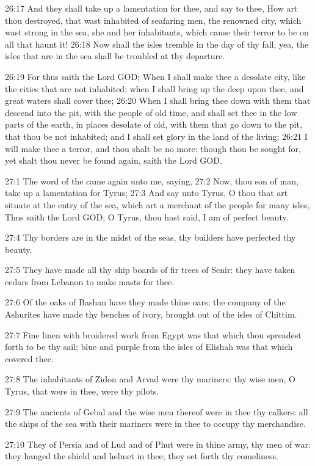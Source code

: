 26:17 And they shall take up a lamentation for thee, and say to thee, How art thou destroyed, that wast inhabited of seafaring men, the renowned city, which wast strong in the sea, she and her inhabitants, which cause their terror to be on all that haunt it!  26:18 Now shall the isles tremble in the day of thy fall; yea, the isles that are in the sea shall be troubled at thy departure.

26:19 For thus saith the Lord GOD; When I shall make thee a desolate city, like the cities that are not inhabited; when I shall bring up the deep upon thee, and great waters shall cover thee; 26:20 When I shall bring thee down with them that descend into the pit, with the people of old time, and shall set thee in the low parts of the earth, in places desolate of old, with them that go down to the pit, that thou be not inhabited; and I shall set glory in the land of the living; 26:21 I will make thee a terror, and thou shalt be no more: though thou be sought for, yet shalt thou never be found again, saith the Lord GOD.

27:1 The word of the \LORD came again unto me, saying, 27:2 Now, thou son of man, take up a lamentation for Tyrus; 27:3 And say unto Tyrus, O thou that art situate at the entry of the sea, which art a merchant of the people for many isles, Thus saith the Lord GOD; O Tyrus, thou hast said, I am of perfect beauty.

27:4 Thy borders are in the midst of the seas, thy builders have perfected thy beauty.

27:5 They have made all thy ship boards of fir trees of Senir: they have taken cedars from Lebanon to make masts for thee.

27:6 Of the oaks of Bashan have they made thine oars; the company of the Ashurites have made thy benches of ivory, brought out of the isles of Chittim.

27:7 Fine linen with broidered work from Egypt was that which thou spreadest forth to be thy sail; blue and purple from the isles of Elishah was that which covered thee.

27:8 The inhabitants of Zidon and Arvad were thy mariners: thy wise men, O Tyrus, that were in thee, were thy pilots.

27:9 The ancients of Gebal and the wise men thereof were in thee thy calkers: all the ships of the sea with their mariners were in thee to occupy thy merchandise.

27:10 They of Persia and of Lud and of Phut were in thine army, thy men of war: they hanged the shield and helmet in thee; they set forth thy comeliness.

